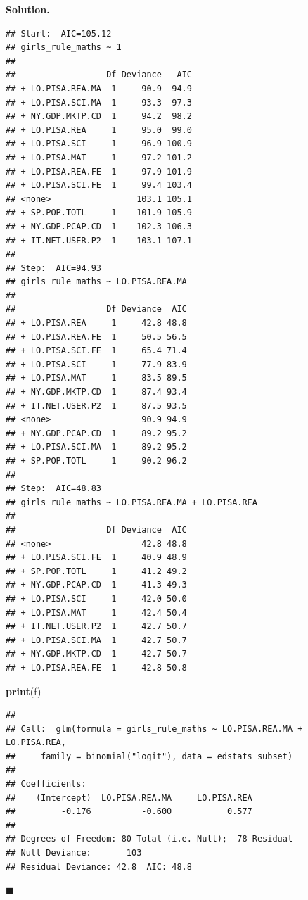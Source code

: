 \documentclass[10pt,b5paper,krantz1]{krantz}
\newenvironment{Shaded}{\begin{snugshade}}{\end{snugshade}}
\newcommand{\DataTypeTok}[1]{\textcolor[rgb]{0.27,0.27,0.27}{#1}}
\newcommand{\FloatTok}[1]{\textcolor[rgb]{0.06,0.06,0.06}{#1}}
\newcommand{\KeywordTok}[1]{\textcolor[rgb]{0.27,0.27,0.27}{\textbf{#1}}}
\newcommand{\NormalTok}[1]{#1}
\newcommand{\OperatorTok}[1]{\textcolor[rgb]{0.43,0.43,0.43}{\textbf{#1}}}
\newcommand{\StringTok}[1]{\textcolor[rgb]{0.5,0.5,0.5}{#1}}
\newenvironment{solution}{%
\bigskip\noindent\textbf{Solution. }%
\it\ignorespaces%
\ignorespaces%
}{\ignorespaces%
\hfill$\blacksquare$%
}
\begin{document}
\begin{solution}
\begin{verbatim}
## Start:  AIC=105.12
## girls_rule_maths ~ 1
## 
##                  Df Deviance   AIC
## + LO.PISA.REA.MA  1     90.9  94.9
## + LO.PISA.SCI.MA  1     93.3  97.3
## + NY.GDP.MKTP.CD  1     94.2  98.2
## + LO.PISA.REA     1     95.0  99.0
## + LO.PISA.SCI     1     96.9 100.9
## + LO.PISA.MAT     1     97.2 101.2
## + LO.PISA.REA.FE  1     97.9 101.9
## + LO.PISA.SCI.FE  1     99.4 103.4
## <none>                 103.1 105.1
## + SP.POP.TOTL     1    101.9 105.9
## + NY.GDP.PCAP.CD  1    102.3 106.3
## + IT.NET.USER.P2  1    103.1 107.1
## 
## Step:  AIC=94.93
## girls_rule_maths ~ LO.PISA.REA.MA
## 
##                  Df Deviance  AIC
## + LO.PISA.REA     1     42.8 48.8
## + LO.PISA.REA.FE  1     50.5 56.5
## + LO.PISA.SCI.FE  1     65.4 71.4
## + LO.PISA.SCI     1     77.9 83.9
## + LO.PISA.MAT     1     83.5 89.5
## + NY.GDP.MKTP.CD  1     87.4 93.4
## + IT.NET.USER.P2  1     87.5 93.5
## <none>                  90.9 94.9
## + NY.GDP.PCAP.CD  1     89.2 95.2
## + LO.PISA.SCI.MA  1     89.2 95.2
## + SP.POP.TOTL     1     90.2 96.2
## 
## Step:  AIC=48.83
## girls_rule_maths ~ LO.PISA.REA.MA + LO.PISA.REA
## 
##                  Df Deviance  AIC
## <none>                  42.8 48.8
## + LO.PISA.SCI.FE  1     40.9 48.9
## + SP.POP.TOTL     1     41.2 49.2
## + NY.GDP.PCAP.CD  1     41.3 49.3
## + LO.PISA.SCI     1     42.0 50.0
## + LO.PISA.MAT     1     42.4 50.4
## + IT.NET.USER.P2  1     42.7 50.7
## + LO.PISA.SCI.MA  1     42.7 50.7
## + NY.GDP.MKTP.CD  1     42.7 50.7
## + LO.PISA.REA.FE  1     42.8 50.8
\end{verbatim}

\begin{Shaded}
\begin{Highlighting}[]
\KeywordTok{print}\NormalTok{(f)}
\end{Highlighting}
\end{Shaded}

\begin{verbatim}
## 
## Call:  glm(formula = girls_rule_maths ~ LO.PISA.REA.MA + LO.PISA.REA, 
##     family = binomial("logit"), data = edstats_subset)
## 
## Coefficients:
##    (Intercept)  LO.PISA.REA.MA     LO.PISA.REA  
##         -0.176          -0.600           0.577  
## 
## Degrees of Freedom: 80 Total (i.e. Null);  78 Residual
## Null Deviance:       103 
## Residual Deviance: 42.8  AIC: 48.8
\end{verbatim}

\begin{Shaded}
\end{Shaded}


\end{solution}
\end{document}
